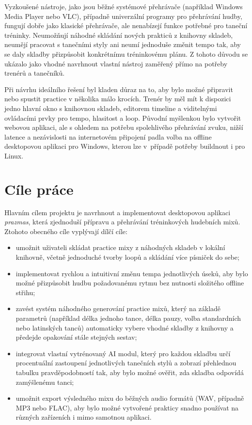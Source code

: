\documentclass[12pt, a4paper,
]{report}
\begin{document}
Vyzkoušené nástroje, jako jsou běžné systémové přehrávače (například Windows Media Player nebo VLC), případně univerzální programy pro přehrávání hudby, fungují dobře jako klasické přehrávače, ale nenabízejí funkce potřebné pro taneční tréninky. Neumožňují náhodné skládání nových prakticů z knihovny skladeb, neumějí pracovat s tanečními styly ani neumí jednoduše změnit tempo tak, aby se daly skladby přizpůsobit konkrétnímu tréninkovému plánu. Z tohoto důvodu se ukázalo jako vhodné navrhnout vlastní nástroj zaměřený přímo na potřeby trenérů a tanečníků.

Při návrhu ideálního řešení byl kladen důraz na to, aby bylo možné připravit nebo spustit practice v několika málo krocích. Trenér by měl mít k dispozici jedno hlavní okno s knihovnou skladeb, editorem timeline a viditelnými ovládacími prvky pro tempo, hlasitost a loop. Původní myšlenkou bylo vytvořit webovou aplikaci, ale s ohledem na potřebu spolehlivého přehrávání zvuku, nižší latence a nezávislosti na internetovém připojení padla volba na offline desktopovou aplikaci pro Windows, kterou lze v~případě potřeby buildnout i pro Linux.

\clearpage
\section{Cíle práce}

Hlavním cílem projektu je navrhnout a implementovat desktopovou aplikaci \textit{prazmas}, která zjednoduší přípravu a přehrávání tréninkových hudebních mixů. Ztohoto obecného cíle vyplývají dílčí cíle:

\begin{itemize}
  \item umožnit uživateli skládat practice mixy z náhodných skladeb v lokální knihovně, včetně jednoduché tvorby loopů a skládání více písniček do sebe;
  \item implementovat rychlou a intuitivní změnu tempa jednotlivých úseků, aby bylo možné přizpůsobit hudbu požadovanému rytmu bez nutnosti složitého offline střihu;
  \item zavést systém náhodného generování practice mixů, který na základě parametrů (například délka jednoho tance, délka pauzy, volba standardních nebo latinských tanců) automaticky vybere vhodné skladby z knihovny a předejde opakování stále stejných sestav;
  \item integrovat vlastní vytrénovaný AI modul, který pro každou skladbu určí procentuální zastoupení jednotlivých tanečních stylů a zobrazí přehlednou tabulku pravděpodobností tak, aby bylo možné ověřit, zda skladba odpovídá zamýšlenému tanci;
  \item umožnit export výsledného mixu do běžných audio formátů (WAV, případně MP3 nebo FLAC), aby bylo možné vytvořené prakticy snadno používat na různých zařízeních i mimo samotnou aplikaci.
\end{itemize}
\end{document}
